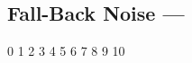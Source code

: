 \subsection[Fall-Back Noise]{Fall-Back Noise --- \UiKey{\I}\UiKey{\SET}}









































0
1
2
3
4
5
6
7
8
9
10
